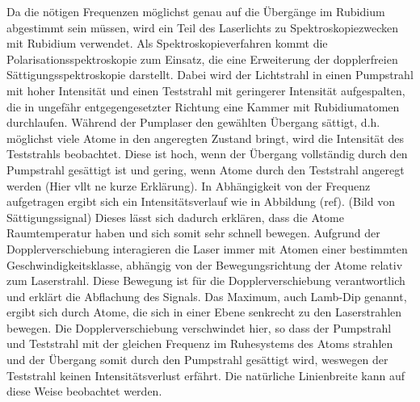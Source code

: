 \documentclass[11pt, a4paper]{article}
\numberwithin{equation}{section}
\newcommand{\korr}[1]{{\color{red}(#1)}}
\begin{document}
Da die nötigen Frequenzen möglichst genau auf die Übergänge im Rubidium abgestimmt sein müssen, wird ein Teil des Laserlichts zu Spektroskopiezwecken mit Rubidium verwendet.
Als Spektroskopieverfahren kommt die Polarisationsspektroskopie zum Einsatz, die eine Erweiterung der dopplerfreien Sättigungsspektroskopie darstellt.
Dabei wird der Lichtstrahl in einen Pumpstrahl mit hoher Intensität und einen Teststrahl mit geringerer Intensität aufgespalten, die in ungefähr entgegengesetzter Richtung eine Kammer mit Rubidiumatomen durchlaufen.
Während der Pumplaser den gewählten Übergang sättigt, d.h. möglichst viele Atome in den angeregten Zustand bringt, wird die Intensität des Teststrahls beobachtet.
Diese ist hoch, wenn der Übergang vollständig durch den Pumpstrahl gesättigt ist und gering, wenn Atome durch den Teststrahl angeregt werden \korr{Hier vllt ne kurze Erklärung}.
In Abhängigkeit von der Frequenz aufgetragen ergibt sich ein Intensitätsverlauf wie in Abbildung \korr{ref}.
\korr{Bild von Sättigungssignal}
Dieses lässt sich dadurch erklären, dass die Atome Raumtemperatur haben und sich somit sehr schnell bewegen.
Aufgrund der Dopplerverschiebung interagieren die Laser immer mit Atomen einer bestimmten Geschwindigkeitsklasse, abhängig von der Bewegungsrichtung der Atome relativ zum Laserstrahl.
Diese Bewegung ist für die Dopplerverschiebung verantwortlich und erklärt die Abflachung des Signals.
Das Maximum, auch Lamb-Dip genannt, ergibt sich durch Atome, die sich in einer Ebene senkrecht zu den Laserstrahlen bewegen.
Die Dopplerverschiebung verschwindet hier, so dass der Pumpstrahl und Teststrahl mit der gleichen Frequenz im Ruhesystems des Atoms strahlen und der Übergang somit durch den Pumpstrahl gesättigt wird, weswegen der Teststrahl keinen Intensitätsverlust erfährt.
Die natürliche Linienbreite kann auf diese Weise beobachtet werden.
\end{document}
